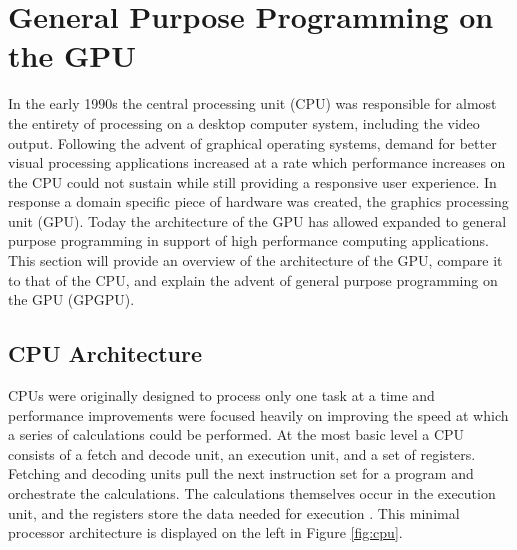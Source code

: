 \section{General Purpose Programming on the GPU}

In the early 1990s the central processing unit (CPU) was responsible for almost the entirety of processing on a desktop computer system, including the video output. Following the advent of graphical operating systems, demand for better visual processing applications increased at a rate which performance increases on the CPU could not sustain while still providing a responsive user experience. In response a domain specific piece of hardware was created, the graphics processing unit (GPU). Today the architecture of the GPU has allowed expanded to general purpose programming in support of high performance computing applications. This section will provide an overview of the architecture of the GPU, compare it to that of the CPU, and explain the advent of general purpose programming on the GPU (GPGPU).

\subsection{CPU Architecture}

CPUs were originally designed to process only one task at a time and performance improvements were focused heavily on improving the speed at which a series of calculations could be performed. At the most basic level a CPU consists of a fetch and decode unit, an execution unit, and a set of registers. Fetching and decoding units pull the next instruction set for a program and orchestrate the calculations. The calculations themselves occur in the execution unit, and the registers store the data needed for execution \cite{gpgpu}. This minimal processor architecture is displayed on the left in Figure \ref{fig:cpu}.

